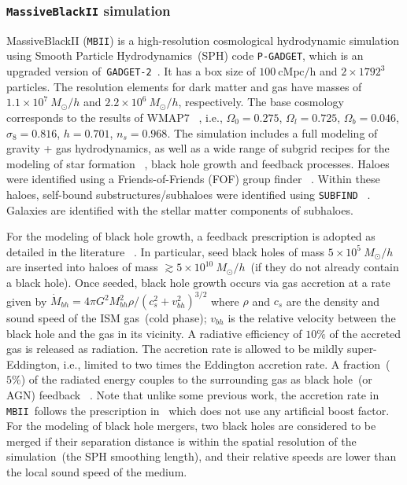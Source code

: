 \documentclass[twocolumn,trackchanges]{aastex63}
\newcommand{\mbii}{\texttt{MBII}}
\begin{document}
\subsubsection{\texttt{MassiveBlackII} simulation}
MassiveBlackII (\mbii) is a high-resolution cosmological hydrodynamic simulation using Smooth Particle Hydrodynamics~(SPH) code \texttt{P-GADGET}, which is an upgraded version of~\texttt{GADGET-2}~\citep{2005MNRAS.364.1105S}. It has a box size of $100~\mathrm{cMpc/h}$ and $2\times1792^3$ particles. The resolution elements for dark matter and gas have masses of $1.1\times 10^7~M_{\odot}/h$ and $2.2\times 10^6~M_{\odot}/h$, respectively. The base cosmology corresponds to the results of WMAP7 ~\citep{2011ApJS..192...18K}, i.e., $\Omega_0=0.275$, $\Omega_l=0.725$, $\Omega_b=0.046$, $\sigma_8=0.816$, $h = 0.701$, $n_s=0.968$.  The simulation includes a full modeling of gravity + gas hydrodynamics, as well as a wide range of subgrid recipes for the modeling of star formation ~\citep{2003MNRAS.339..289S}, black hole growth and feedback processes. Haloes were identified using a Friends-of-Friends (FOF) group finder ~\citep{1985ApJ...292..371D}. Within these haloes, self-bound substructures/subhaloes were identified using \texttt{SUBFIND} ~\citep{Springel2001, 2005MNRAS.364.1105S}. Galaxies are identified with the stellar matter components of subhaloes.

For the modeling of black hole growth, a feedback prescription is adopted as detailed in the literature ~\citep{2005Natur.433..604D, 2005MNRAS.361..776S}. In particular, seed black holes of mass $5\times 10^{5}~M_{\odot}/h$ are inserted into haloes of mass $\gtrsim 5\times 10^{10}~M_{\odot}/h$~(if they do not already contain a black hole). Once seeded, black hole growth occurs via gas accretion at a rate given by $\dot{M}_{bh}={4\pi G^2 M_{bh}^2 \rho}/{(c_s^2+v_{bh}^2)^{3/2}}$ where $\rho$ and $c_s$ are the density and sound speed of the ISM gas~(cold phase); $v_{bh}$ is the relative velocity between the black hole and the gas in its vicinity. A radiative efficiency of $10\%$ of the accreted gas is released as radiation. The accretion rate is allowed to be mildly super-Eddington, i.e., limited to two times the Eddington accretion rate. A fraction~($5\%$) of the radiated energy couples to the surrounding gas as black hole~(or AGN) feedback ~\citep{2005Natur.433..604D}.  Note that unlike some previous work, the accretion rate in \mbii\ follows the prescription in~\citet{Pelupessy2007} which does not use any artificial boost factor. For the modeling of black hole mergers, two black holes are considered to be merged if their separation distance is within the spatial resolution of the simulation~(the SPH smoothing length), and their relative speeds are lower than the local sound speed of the medium.
\end{document}

